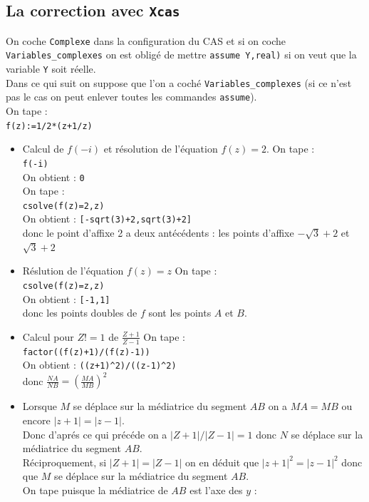 \documentclass[a4paper,11pt]{book}
\begin{document}
\subsection{La correction avec {\tt Xcas}}
On coche {\tt Complexe}  dans la configuration 
du CAS et si on coche {\tt Variables\_complexes} on est oblig\'e de mettre
{\tt assume Y,real)} si on veut que la variable {\tt Y} soit r\'eelle.\\
Dans ce qui suit on suppose que l'on a coch\'e {\tt Variables\_complexes}
(si ce n'est pas le cas on peut enlever toutes les commandes {\tt assume}).\\
On tape :\\
{\tt f(z):=1/2*(z+1/z)}
\begin{itemize}
\item Calcul de $f(-i)$ et r\'esolution de l'\'equation $f(z)=2$.
On tape :\\
{\tt f(-i)}\\
On obtient : {\tt 0}\\
On tape :\\
{\tt csolve(f(z)=2,z)}\\
On obtient : {\tt [-sqrt(3)+2,sqrt(3)+2]}\\
donc le point d'affixe 2 a deux ant\'ec\'edents : 
les points d'affixe $-\sqrt 3+2$ et $\sqrt 3+2$
\item R\'eslution de l'\'equation $f(z)=z$
On tape :\\
{\tt csolve(f(z)=z,z)}\\
On obtient : {\tt [-1,1]}\\ 
donc les points doubles de $f$ sont les points $A$ et $B$.
\item Calcul pour $Z!=1$ de $\frac{Z+1}{Z-1}$
On tape :\\
{\tt factor((f(z)+1)/(f(z)-1))}\\
On obtient : {\tt ((z+1)\verb|^|2)/((z-1)\verb|^|2)}\\ 
donc $\frac{NA}{NB}=(\frac{MA}{MB})^2$
\item Lorsque $M$ se d\'eplace sur la m\'ediatrice du 
segment $AB$ on a $MA=MB$ ou encore $|z+1|=|z-1|$.\\
Donc d'apr\'es ce qui pr\'ec\'ede  on a 
$|Z+1|/|Z-1|=1$ donc $N$ se d\'eplace sur la m\'ediatrice du 
segment $AB$.\\
R\'eciproquement, si $|Z+1|=|Z-1|$ on en d\'eduit que
$|z+1|^2=|z-1|^2$ donc que $M$ se d\'eplace sur la m\'ediatrice 
du segment $AB$.\\
On tape puisque la m\'ediatrice de $AB$ est l'axe des $y$ :\\

\end{itemize}
\end{document}
